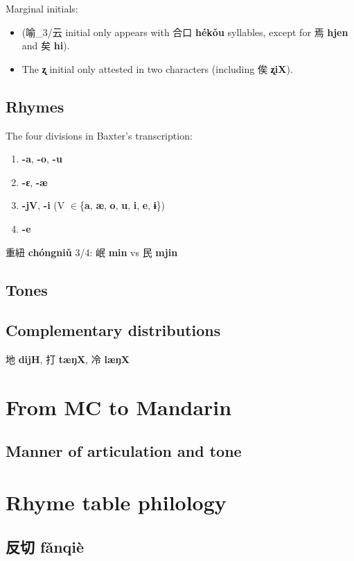 \documentclass[oneside,a4paper,11pt]{article}
\newcommand{\ipa}[1]{{\phon\textbf{#1}}}
\newcommand{\zh}[1]{{\cn #1}}
\newcommand{\zhc}[2]{\zh{#1} \ipa{#2}}
\begin{document}
Marginal initials:
\begin{itemize}
\item 
(\zh{喻}_3/\zh{云} initial only appears with \zhc{合口}{hékǒu} syllables, except for \zhc{焉}{hjen} and \zhc{矣}{hi}).
\item The \ipa{ʐ} initial only attested in two characters (including \zhc{俟}{ʐiX}).
\end{itemize}

\subsection{Rhymes}

The four divisions in Baxter's transcription:
\begin{enumerate}
\item \ipa{-a}, \ipa{-o}, \ipa{-u}
\item \ipa{-ɛ}, \ipa{-æ}
\item \ipa{-jV}, \ipa{-i} (V $\in$\{\ipa{a}, \ipa{æ}, \ipa{o}, \ipa{u},  \ipa{i}, \ipa{e}, \ipa{ɨ}\})
\item \ipa{-e}
\end{enumerate}

\zhc{重紐}{chóngniǔ} 3/4: \zhc{岷}{min} vs \zhc{民}{mjin}

\subsection{Tones}

\subsection{Complementary distributions}

\zhc{地}{dijH}, \zhc{打}{tæŋX}, \zhc{冷}{læŋX}

\section{From MC to Mandarin}

\subsection{Manner of articulation and tone}

\section{Rhyme table philology} 

\subsection{\zhc{反切}{fǎnqiè}} \label{sec:fanqie}
\end{document}
